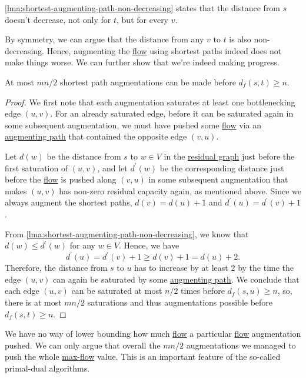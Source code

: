 \begin{note}
	\autoref{lma:shortest-augmenting-path-non-decreasing} states that the distance from \(s\) doesn't decrease, not only for \(t\), but for every \(v\).
\end{note}

By symmetry, we can argue that the distance from any \(v\) to \(t\) is also non-decreasing. Hence, augmenting the \hyperref[def:flow]{flow} using shortest paths indeed does not make things worse. We can further show that we're indeed making progress.

\begin{lemma}\label{lma:shortest-augmenting-path-progress}
	At most \(mn / 2\) shortest path augmentations can be made before \(d_f(s, t) \geq n\).
\end{lemma}
\begin{proof}
	We first note that each augmentation saturates at least one bottlenecking edge \((u, v)\). For an already saturated edge, before it can be saturated again in some subsequent augmentation, we must have pushed some \hyperref[def:flow]{flow} via an \hyperref[def:augmenting-path]{augmenting path} that contained the opposite edge \((v, u)\).

	Let \(d(w)\) be the distance from \(s\) to \(w \in V\) in the \hyperref[def:residual-graph]{residual graph} just before the first saturation of \((u, v)\), and let \(d^{\prime} (w)\) be the corresponding distance just before the \hyperref[def:flow]{flow} is pushed along \((v, u)\) in some subsequent augmentation that makes \((u, v)\) has non-zero residual capacity again, as mentioned above. Since we always augment the shortest paths, \(d(v) = d(u) + 1\) and \(d^{\prime} (u) = d^{\prime} (v) + 1\).

	From \autoref{lma:shortest-augmenting-path-non-decreasing}, we know that \(d(w) \leq d^{\prime} (w)\) for any \(w \in V\).  Hence, we have
	\[
		d^{\prime} (u)
		= d^{\prime} (v) + 1
		\geq d(v) + 1
		= d(u) + 2.
	\]
	Therefore, the distance from \(s\) to \(u\) has to increase by at least \(2\) by the time the edge \((u, v)\) can again be saturated by some \hyperref[def:augmenting-path]{augmenting path}. We conclude that each edge \((u, v)\) can be saturated at most \(n / 2\) times before \(d_f(s, u) \geq n\), so, there is at most \(mn / 2\) saturations and thus augmentations possible before \(d_f(s, t) \geq n\).
\end{proof}

\begin{note}
	We have no way of lower bounding how much \hyperref[def:flow]{flow} a particular \hyperref[def:flow]{flow} augmentation pushed. We can only argue that overall the \(mn / 2\) augmentations we managed to push the whole \hyperref[prb:s-t-max-flow]{max-flow} value. This is an important feature of the so-called primal-dual algorithms.
\end{note}

